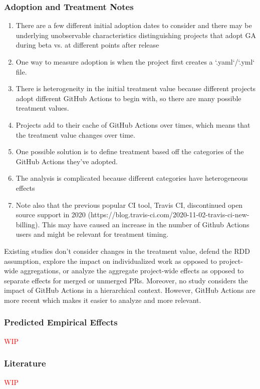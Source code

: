 \documentclass[source/paper/main.tex]{subfiles}
\begin{document}
\subsubsection{Adoption and Treatment Notes}
\begin{enumerate}
    \item There are a few different initial adoption dates to consider and there may be underlying unobservable characteristics distinguishing projects that adopt GA during beta vs. at different points after release
    \item One way to measure adoption is when the project first creates a `.yaml`/`.yml` file. 
    \item There is heterogeneity in the initial treatment value because different projects adopt different GitHub Actions to begin with, so there are many possible treatment values. 
    \item Projects add to their cache of GitHub Actions over times, which means that the treatment value changes over time. 
    \item One possible solution is to define treatment based off the categories of the GitHub Actions they've adopted. 
    \item The analysis is complicated because different categories have heterogeneous effects 
    \item Note also that the previous popular CI tool, Travis CI, discontinued open source support in 2020 (https://blog.travis-ci.com/2020-11-02-travis-ci-new-billing). This may have caused an increase in the number of Github Actions users and might be relevant for treatment timing. 
\end{enumerate}

Existing studies don't consider changes in the treatment value, defend the RDD assumption, explore the impact on individualized work as opposed to project-wide aggregations, or analyze the aggregate project-wide effects as opposed to separate effects for merged or unmerged PRs. Moreover, no study considers the impact of GitHub Actions in a hierarchical context. However, GitHub Actions are more recent which makes it easier to analyze and more relevant. 
\subsubsection{Predicted Empirical Effects}
\textcolor{red}{WIP}
\subsubsection{Literature}
\textcolor{red}{WIP}
\end{document}
